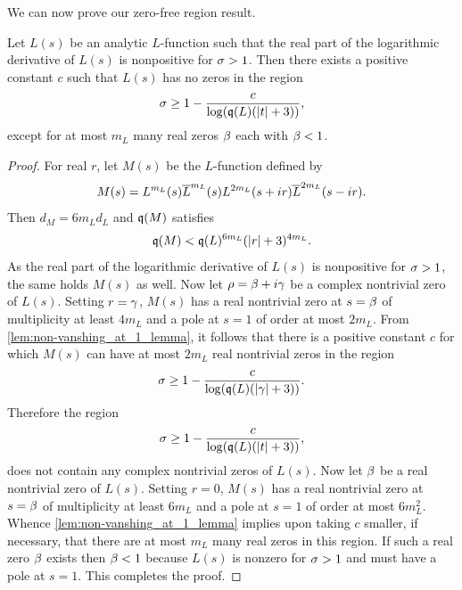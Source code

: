     We can now prove our zero-free region result.

    \begin{theorem}\label{thm:zero_free_region_generic}
      Let \(L(s)\) be an analytic \(L\)-function such that the real part of the logarithmic derivative of \(L(s)\) is nonpositive for \(\sigma > 1\). Then there exists a positive constant \(c\) such that \(L(s)\) has no zeros in the region
      \[
        \sigma \ge 1-\frac{c}{\log(\mathfrak{q}(L)(|t|+3))},
      \]
      except for at most \(m_{L}\) many real zeros \(\beta\) each with \(\beta < 1\).
    \end{theorem}
    \begin{proof}
      For real \(r\), let \(M(s)\) be the \(L\)-function defined by
      \[
        M(s) = L^{m_{L}}(s)\overline{L}^{m_{L}}(s)L^{2m_{L}}(s+ir)\overline{L}^{2m_{L}}(s-ir).
      \]
      Then \(d_{M} = 6m_{L}d_{L}\) and \(\mathfrak{q}(M)\) satisfies
      \[
        \mathfrak{q}(M) < \mathfrak{q}(L)^{6m_{L}}(|r|+3)^{4m_{L}}.
      \]
      As the real part of the logarithmic derivative of \(L(s)\) is nonpositive for \(\sigma > 1\), the same holds \(M(s)\) as well. Now let \(\rho = \beta+i\gamma\) be a complex nontrivial zero of \(L(s)\). Setting \(r = \gamma\), \(M(s)\) has a real nontrivial zero at \(s = \beta\) of multiplicity at least \(4m_{L}\) and a pole at \(s = 1\) of order at most \(2m_{L}\). From \cref{lem:non-vanshing_at_1_lemma}, it follows that there is a positive constant \(c\) for which \(M(s)\) can have at most \(2m_{L}\) real nontrivial zeros in the region
      \[
        \sigma \ge 1-\frac{c}{\log(\mathfrak{q}(L)(|\gamma|+3))}.
      \]
      Therefore the region
      \[
        \sigma \ge 1-\frac{c}{\log(\mathfrak{q}(L)(|t|+3))},
      \] 
      does not contain any complex nontrivial zeros of \(L(s)\). Now let \(\beta\) be a real nontrivial zero of \(L(s)\). Setting \(r = 0\), \(M(s)\) has a real nontrivial zero at \(s = \beta\) of multiplicity at least \(6m_{L}\) and a pole at \(s = 1\) of order at most \(6m_{L}^{2}\). Whence \cref{lem:non-vanshing_at_1_lemma} implies upon taking \(c\) smaller, if necessary, that there are at most \(m_{L}\) many real zeros in this region. If such a real zero \(\beta\) exists then \(\beta < 1\) because \(L(s)\) is nonzero for \(\sigma > 1\) and must have a pole at \(s = 1\). This completes the proof.
    \end{proof}
    
